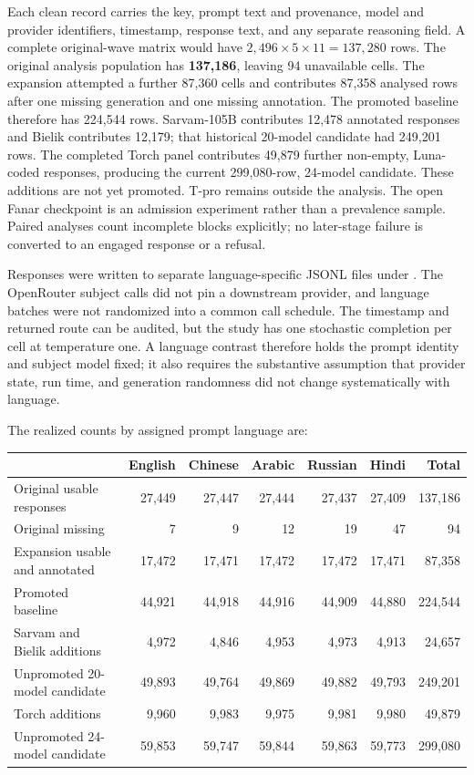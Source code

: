 \documentclass[11pt]{article}
\DeclareRobustCommand{\file}[1]{\texttt{\seqsplit{#1}}}
\begin{document}
Each clean record carries the key, prompt text and provenance, model and
provider identifiers, timestamp, response text, and any separate reasoning
field. A complete original-wave matrix would have
$2,496\times5\times11=137,280$ rows. The original analysis population has
\textbf{137,186}, leaving 94 unavailable cells. The expansion attempted a
further 87,360 cells and contributes 87,358 analysed rows after one missing
generation and one missing annotation. The promoted baseline therefore has
224,544 rows. Sarvam-105B contributes 12,478 annotated responses and Bielik
contributes 12,179; that historical 20-model candidate had 249,201 rows. The
completed Torch panel contributes 49,879 further non-empty, Luna-coded
responses, producing the current 299,080-row, 24-model candidate. These
additions are not yet promoted. T-pro remains outside the analysis. The open
Fanar checkpoint is an admission experiment
rather than a prevalence sample.
Paired analyses count incomplete blocks explicitly; no later-stage failure is
converted to an engaged response or a refusal.

Responses were written to separate language-specific JSONL files under
\file{annotations/full\_v1/responses/}. The OpenRouter subject calls did not
pin a downstream provider, and language batches were not randomized into a
common call schedule. The timestamp and returned route can be audited, but the
study has one stochastic completion per cell at temperature one. A language
contrast therefore holds the prompt identity and subject model fixed; it also
requires the substantive assumption that provider state, run time, and
generation randomness did not change systematically with language.

The realized counts by assigned prompt language are:

\begin{center}
\small
\begin{tabular}{@{}lrrrrrr@{}}
\toprule & English & Chinese & Arabic & Russian & Hindi & Total \\
\midrule
Original usable responses & 27,449 & 27,447 & 27,444 & 27,437 & 27,409 & 137,186 \\
Original missing & 7 & 9 & 12 & 19 & 47 & 94 \\
Expansion usable and annotated & 17,472 & 17,471 & 17,472 & 17,472 & 17,471 & 87,358 \\
Promoted baseline & 44,921 & 44,918 & 44,916 & 44,909 & 44,880 & 224,544 \\
Sarvam and Bielik additions & 4,972 & 4,846 & 4,953 & 4,973 & 4,913 & 24,657 \\
Unpromoted 20-model candidate & 49,893 & 49,764 & 49,869 & 49,882 & 49,793 & 249,201 \\
Torch additions & 9,960 & 9,983 & 9,975 & 9,981 & 9,980 & 49,879 \\
Unpromoted 24-model candidate & 59,853 & 59,747 & 59,844 & 59,863 & 59,773 & 299,080 \\
\bottomrule
\end{tabular}
\end{center}
\end{document}
